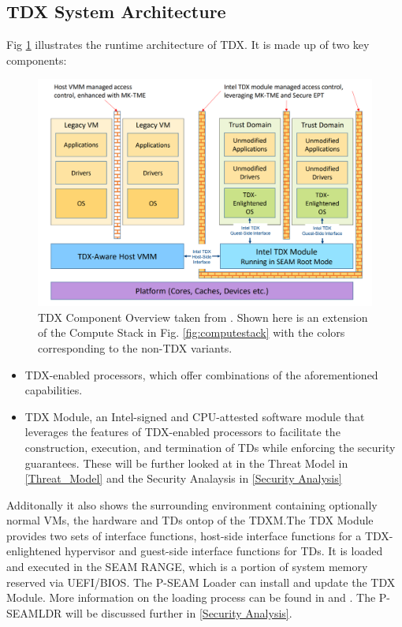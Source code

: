 \subsection{TDX System Architecture}
\label{TDX Architecture}
Fig \ref{fig:component-overview} illustrates the runtime architecture of TDX. It is made up of two key components: 
\begin{figure}
\centering
\includegraphics[width=\textwidth]{figures/TDX-Component-Overview}
\caption{TDX Component Overview taken from \cite[p.~19]{noauthor_tdx-module-10-public-specpdf_nodate}. Shown here is an extension of the Compute Stack in Fig. \ref{fig:computestack} with the colors corresponding to the non-TDX variants.}
\label{fig:component-overview}
\end{figure}
\begin{itemize}
    \item TDX-enabled processors, which offer combinations of the aforementioned capabilities.
    \item TDX Module, an Intel-signed and CPU-attested software module that leverages the features of TDX-enabled processors to facilitate the construction, execution, and termination of TDs while enforcing the security guarantees. These will be further looked at in the Threat Model in \cref{Threat_Model} and the Security Analaysis in \cref{Security Analysis}
\end{itemize}
Additonally it also shows the surrounding environment containing optionally normal VMs, the hardware and TDs ontop of the TDXM.The TDX Module provides two sets of interface functions, host-side interface functions for a TDX-enlightened hypervisor and guest-side interface functions for TDs. It is loaded and executed in the SEAM RANGE, which is a portion of system memory reserved via UEFI/BIOS. The P-SEAM Loader can install and update the TDX Module. More information on the loading process can be found in \cite{noauthor_white_nodate} and \cite{noauthor_tdx-module-10-public-specpdf_nodate}. The P-SEAMLDR will be discussed further in \ref{Security Analysis}.
